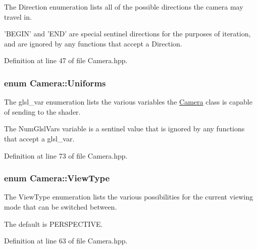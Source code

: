 The Direction enumeration lists all of the possible directions the camera may travel in. 

'B\-E\-G\-I\-N' and 'E\-N\-D' are special sentinel directions for the purposes of iteration, and are ignored by any functions that accept a Direction. 

Definition at line 47 of file Camera.\-hpp.

\hypertarget{class_camera_a630738fd23098d44c0d15ee28d5649dd}{
\subsubsection[{Uniforms}]{\setlength{\rightskip}{0pt plus 5cm}enum {\bf Camera\-::\-Uniforms}}}\label{class_camera_a630738fd23098d44c0d15ee28d5649dd}


The glsl\-\_\-var enumeration lists the various variables the \hyperlink{class_camera}{Camera} class is capable of sending to the shader. 

The Num\-Glsl\-Vars variable is a sentinel value that is ignored by any functions that accept a glsl\-\_\-var. 

Definition at line 73 of file Camera.\-hpp.

\hypertarget{class_camera_aaa256acd50a2fa143d9f8d9456e2802f}{
\subsubsection[{View\-Type}]{\setlength{\rightskip}{0pt plus 5cm}enum {\bf Camera\-::\-View\-Type}}}\label{class_camera_aaa256acd50a2fa143d9f8d9456e2802f}


The View\-Type enumeration lists the various possibilities for the current viewing mode that can be switched between. 

The default is P\-E\-R\-S\-P\-E\-C\-T\-I\-V\-E. 

Definition at line 63 of file Camera.\-hpp.



